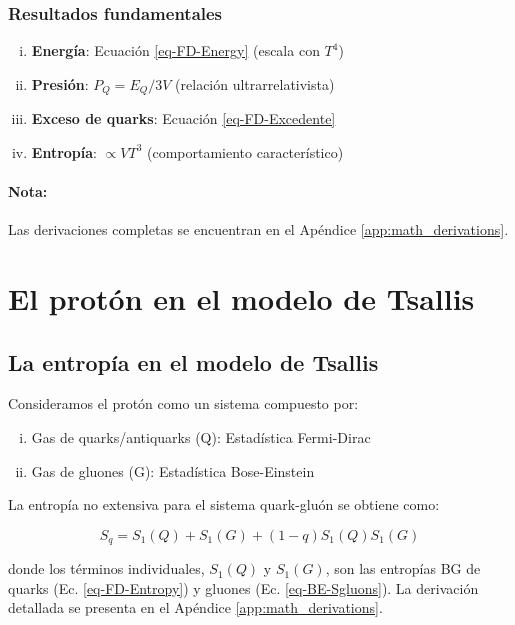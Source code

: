 \subsubsection*{Resultados fundamentales}
\begin{enumerate}[i.]
    \item \textbf{Energía}: Ecuación \eqref{eq-FD-Energy} (escala con $T^4$)
    \item \textbf{Presión}: $P_Q = E_Q/3V$ (relación ultrarrelativista)
    \item \textbf{Exceso de quarks}: Ecuación \eqref{eq-FD-Excedente}
    \item \textbf{Entropía}: $\propto V T^3$ (comportamiento característico)
\end{enumerate}

\paragraph{Nota:} Las derivaciones completas se encuentran en el Apéndice \ref{app:math_derivations}.

\section{El protón en el modelo de Tsallis}

\subsection{La entropía en el modelo de Tsallis}

Consideramos el protón como un sistema compuesto por:

\begin{enumerate}[i.]
    \item Gas de quarks/antiquarks (Q): Estadística Fermi-Dirac
    \item Gas de gluones (G): Estadística Bose-Einstein
\end{enumerate}

La entropía no extensiva para el sistema quark-gluón se obtiene como:

\begin{equation}\label{eq-Entropy-Tsallis}
{S}_q = {S}_1(Q) + {S}_1(G) + (1-q){S}_1(Q){S}_1(G)
\end{equation}

donde los términos individuales, ${S}_1(Q)$ y ${S}_1(G)$, son las entropías BG de quarks (Ec. \ref{eq-FD-Entropy}) y gluones (Ec. \ref{eq-BE-Sgluons}). La derivación detallada se presenta en el Apéndice \ref{app:math_derivations}.


